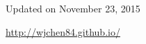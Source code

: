 \documentclass{res}
\begin{document}
\begin{resume}
%

\vspace{0.3in}
\centerline{\footnotesize Updated on November 23, 2015}
\centerline{\footnotesize \url{http://wjchen84.github.io/}}

\end{resume}
\end{document}
